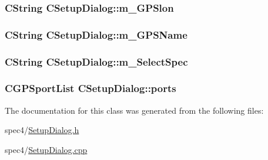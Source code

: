 \label{classCSetupDialog_ad5fbe9645170fc5bf172f338aa4c029e}
\hypertarget{classCSetupDialog_aeaf91b37cc812e8de9330f2ba12d27b3}{
\subsubsection[{m\_\-GPSlon}]{\setlength{\rightskip}{0pt plus 5cm}CString {\bf CSetupDialog::m\_\-GPSlon}}}
\label{classCSetupDialog_aeaf91b37cc812e8de9330f2ba12d27b3}
\hypertarget{classCSetupDialog_aad1a3ae46513e4df1199e6ff13715a6f}{
\subsubsection[{m\_\-GPSName}]{\setlength{\rightskip}{0pt plus 5cm}CString {\bf CSetupDialog::m\_\-GPSName}}}
\label{classCSetupDialog_aad1a3ae46513e4df1199e6ff13715a6f}
\hypertarget{classCSetupDialog_ab857444d15fb333c2a7232e3b9ee799d}{
\subsubsection[{m\_\-SelectSpec}]{\setlength{\rightskip}{0pt plus 5cm}CString {\bf CSetupDialog::m\_\-SelectSpec}}}
\label{classCSetupDialog_ab857444d15fb333c2a7232e3b9ee799d}
\hypertarget{classCSetupDialog_ac05f58b8de217ce33a9f52b7f41a497a}{
\subsubsection[{ports}]{\setlength{\rightskip}{0pt plus 5cm}CGPSportList {\bf CSetupDialog::ports}}}
\label{classCSetupDialog_ac05f58b8de217ce33a9f52b7f41a497a}


The documentation for this class was generated from the following files:\begin{DoxyCompactItemize}
\item 
spec4/\hyperlink{SetupDialog_8h}{SetupDialog.h}\item 
spec4/\hyperlink{SetupDialog_8cpp}{SetupDialog.cpp}\end{DoxyCompactItemize}
